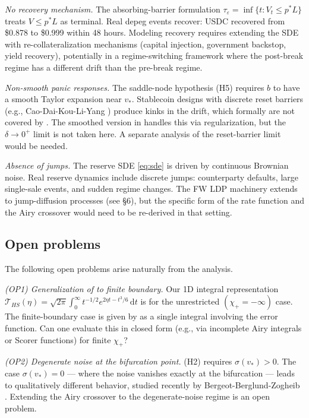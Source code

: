 \documentclass[11pt,a4paper]{article}
\theoremstyle{plain}
\theoremstyle{definition}
\newcommand{\eps}{\varepsilon}
\renewcommand{\d}{\mathrm{d}}
\begin{document}
\emph{No recovery mechanism.} The absorbing-barrier formulation $\tau_\eps = \inf\{t : V_t \leq p^*L\}$ treats $V \leq p^*L$ as terminal. Real depeg events recover: USDC recovered from \$0.878 to \$0.999 within 48 hours. Modeling recovery requires extending the SDE with re-collateralization mechanisms (capital injection, government backstop, yield recovery), potentially in a regime-switching framework where the post-break regime has a different drift than the pre-break regime.

\emph{Non-smooth panic responses.} The saddle-node hypothesis (H5) requires $b$ to have a smooth Taylor expansion near $v_*$. Stablecoin designs with discrete reset barriers (e.g., Cao-Dai-Kou-Li-Yang \cite{CaoDaiKouLiYang2025}) produce kinks in the drift, which formally are not covered by . The smoothed version in  handles this via regularization, but the $\delta \to 0^+$ limit is not taken here. A separate analysis of the reset-barrier limit would be needed.

\emph{Absence of jumps.} The reserve SDE \eqref{eq:sde} is driven by continuous Brownian noise. Real reserve dynamics include discrete jumps: counterparty defaults, large single-sale events, and sudden regime changes. The FW LDP machinery extends to jump-diffusion processes (see \cite{FreidlinWentzell2012} \S 6), but the specific form of the rate function and the Airy crossover would need to be re-derived in that setting.

\subsection{Open problems}

The following open problems arise naturally from the analysis.

\emph{(OP1) Generalization of  to finite boundary.} Our 1D integral representation $\mathcal T_{HS}(\eta) = \sqrt{2\pi}\int_0^\infty t^{-1/2}e^{2\eta t - t^3/6}\,\d t$ is for the unrestricted $(\chi_+ = -\infty)$ case. The finite-boundary case is given by  as a single integral involving the error function. Can one evaluate this in closed form (e.g., via incomplete Airy integrals or Scorer functions) for finite $\chi_+$?

\emph{(OP2) Degenerate noise at the bifurcation point.} (H2) requires $\sigma(v_*) > 0$. The case $\sigma(v_*) = 0$ --- where the noise vanishes exactly at the bifurcation --- leads to qualitatively different behavior, studied recently by Bergeot-Berglund-Zogheib \cite{BergeotBerglundZogheib2025}. Extending the Airy crossover to the degenerate-noise regime is an open problem.
\end{document}
